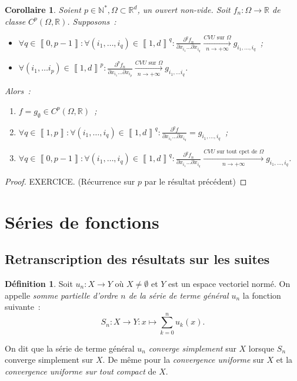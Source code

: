 \documentclass{report}
\newtheorem{cor}[thm]{Corollaire}
\theoremstyle{definition}
\newtheorem{déf}[thm]{Définition}
\theoremstyle{remark}
\numberwithin{equation}{section}
\newcommand{\R}{\mathbb R}
\newcommand{\N}{\mathbb N}
\newcommand{\CONV}[5]{\xrightarrow[#2 \to #3]{#4 \text{ #5 } #1}}
\newcommand{\CVU}[3]{\CONV{#1}{#2}{#3}{CVU}{sur}}
\newcommand{\CVUc}[3]{\CONV{#1}{#2}{#3}{CVU}{sur tout cpct de}}
\newcommand{\intint}[2]{\left\llbracket#1, #2\right\rrbracket}
\newcommand{\pinfty}{{+\infty}}
\newcommand{\evn}{espace vectoriel normé}
\begin{document}
			\begin{cor} Soient $p \in \N^*, \Omega \subset \R^d$, un ouvert non-vide. Soit $f_n : \Omega \to \R$ de classe $C^p(\Omega, \R)$. Supposons~:
			\begin{itemize}
				\item $\displaystyle \forall q \in \intint 0{p-1} : \forall (i_1, \ldots, i_q) \in \intint 1d^q :
					\frac {\partial^qf_n}{\partial x_{i_1}\ldots\partial x_{i_q}} \CVU \Omega n\pinfty g_{i_1, \ldots, i_q}$~;
				\item $\displaystyle \forall (i_1, \ldots i_p) \in \intint 1d^p :
					\frac {\partial^pf_n}{\partial x_{i_1}\ldots\partial x_{i_p}} \CVU \Omega n\pinfty g_{i_1, \ldots i_q}$.
			\end{itemize}
			Alors~:
			\begin{enumerate}
				\item $f = g_\emptyset \in C^p(\Omega, \R)$~;
				\item $\displaystyle \forall q \in \intint 1p : \forall (i_1, \ldots, i_q) \in \intint 1d^q :
					\frac {\partial^qf}{\partial x_{i_1}\ldots\partial x_{i_q}} = g_{i_1, \ldots, i_q}$~;
				\item $\forall q \in \intint 0{p-1} : \forall (i_1, \ldots, i_q) \in \intint 1d^q :
					\frac {\partial^qf_n}{\partial x_{i_1}\ldots\partial x_{i_q}} \CVUc \Omega n\pinfty g_{i_1, \ldots, i_q}$.
			\end{enumerate}
			\end{cor}

			\begin{proof} EXERCICE. (Récurrence sur $p$ par le résultat précédent)
			\end{proof}

	\section{Séries de fonctions}
		\subsection{Retranscription des résultats sur les suites}
			\begin{déf} Soit $u_n : X \to Y$ où $X \neq \emptyset$ et $Y$ est un \evn. On appelle \textit{somme partielle d'ordre $n$ de la série de terme
			général $u_n$} la fonction suivante~:
			\begin{equation}
				S_n : X \to Y : x \mapsto \sum_{k=0}^nu_k(x).
			\end{equation}

			On dit que la série de terme général $u_n$ \textit{converge simplement} sur $X$ lorsque $S_n$ converge simplement sur $X$. De même pour la
			\textit{convergence uniforme} sur $X$ et la \textit{convergence uniforme sur tout compact} de $X$.
			\end{déf}
\end{document}
